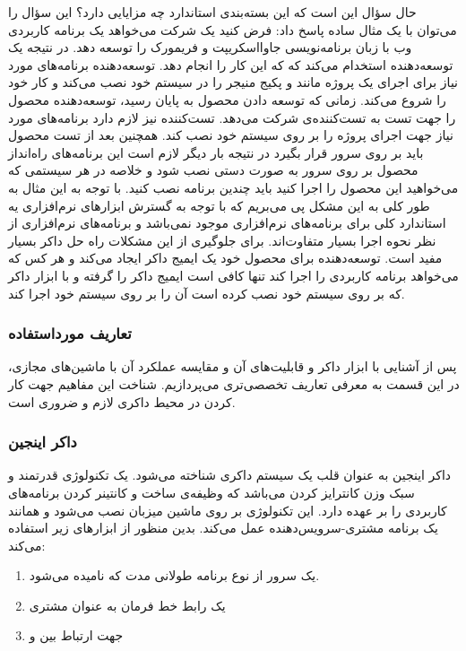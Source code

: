 حال سؤال این است که این بسته‌بندی استاندارد چه مزایایی دارد؟ این سؤال را می‌توان با یک مثال ساده پاسخ داد: فرض کنید یک شرکت می‌خواهد یک برنامه کاربردی وب با زبان برنامه‌نویسی جاوااسکریپت و فریمورک
را توسعه دهد. در نتیجه یک توسعه‌دهنده استخدام می‌کند که که این کار را انجام دهد. توسعه‌دهنده برنامه‌های مورد نیاز برای اجرای یک پروژه مانند
و پکیج منیجر
را در سیستم خود نصب می‌کند و کار خود را شروع می‌کند. زمانی که توسعه دادن محصول به پایان رسید، توسعه‌دهنده محصول را جهت تست به تست‌کننده‌ی شرکت می‌دهد. تست‌کننده نیز لازم دارد برنامه‌های مورد نیاز جهت اجرای پروژه را بر روی سیستم خود نصب کند. همچنین بعد از تست محصول باید بر روی سرور قرار بگیرد در نتیجه بار دیگر لازم است این برنامه‌های راه‌انداز محصول بر روی سرور به صورت دستی نصب شود و خلاصه در هر سیستمی که می‌خواهید این محصول را اجرا کنید باید چندین برنامه نصب کنید. با توجه به این مثال به طور کلی به این مشکل پی می‌بریم که با توجه به گسترش ابزارهای نرم‌افزاری یه استاندارد کلی برای برنامه‌های نرم‌افزاری موجود نمی‌باشد و برنامه‌های نرم‌افزاری از نظر نحوه اجرا بسیار متفاوت‌اند.  برای جلوگیری از این مشکلات راه حل داکر بسیار مفید است. توسعه‌دهنده برای محصول خود یک ایمیج داکر ایجاد می‌کند و هر کس که می‌خواهد برنامه کاربردی را اجرا کند تنها کافی است ایمیج داکر را گرفته و با ابزار داکر که بر روی سیستم خود نصب کرده است آن را بر روی سیستم خود اجرا کند.


\subsubsection{تعاریف مورداستفاده}

پس از آشنایی با ابزار داکر و قابلیت‌های آن و مقایسه عملکرد آن با ماشین‌های مجازی، در این قسمت به معرفی تعاریف تخصصی‌تری می‌پردازیم. شناخت این مفاهیم جهت کار کردن در محیط داکری لازم و ضروری است.

\subsubsection*{داکر اینجین}
داکر اینجین به عنوان قلب یک سیستم داکری شناخته می‌شود. یک تکنولوژی قدرتمند و سبک وزن کانترایز کردن  می‌باشد که وظیفه‌ی ساخت و کانتینر کردن برنامه‌های کاربردی را بر عهده دارد. این تکنولوژی بر روی ماشین میزبان نصب می‌شود و همانند یک برنامه مشتری-سرویس‌دهنده عمل می‌کند. بدین منظور از ابزارهای زیر استفاده می‌کند:
\begin{enumerate}
	\item 
	یک سرور از نوع برنامه طولانی مدت  که
	نامیده می‌شود.
	\item 
	یک رابط خط فرمان به عنوان مشتری
	
	\item 
	جهت ارتباط بین
	و
	
\end{enumerate}

